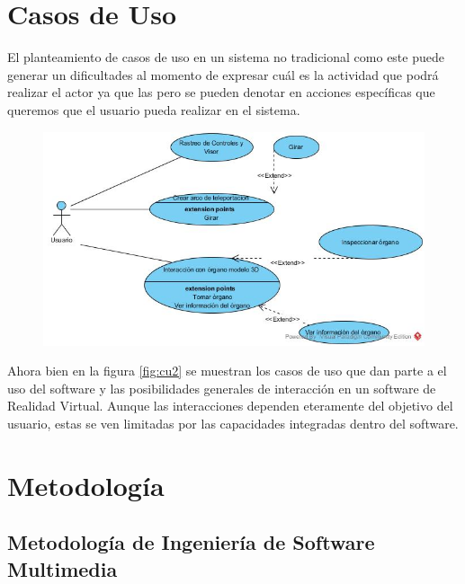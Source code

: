 \section{Casos de Uso}
El planteamiento de casos de uso en un sistema no tradicional como este puede generar un dificultades al momento de expresar cuál es la actividad que podrá 
realizar el actor ya que las  pero se pueden denotar en acciones específicas que queremos que el usuario pueda realizar en el sistema.\\
\begin{figure}[H]
	\begin{center}
 		\includegraphics[width = 1\textwidth]{v3/images/cu1.jpg}
	\end{center} 
\end{figure}
Ahora bien en la figura \ref{fig:cu2} se muestran los casos de uso que dan parte a el uso del software y las posibilidades generales de interacción en un software de 
Realidad Virtual. Aunque las interacciones dependen eteramente del objetivo del usuario, estas se ven limitadas por las capacidades integradas dentro del software.\\

\section{Metodología}

\subsection{Metodología de Ingeniería de Software Multimedia}
